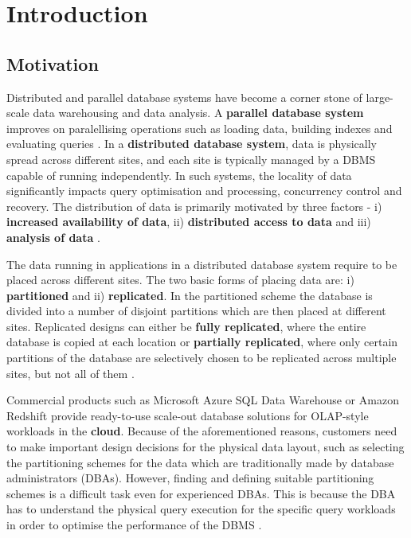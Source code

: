 \chapter{Introduction}

\section{Motivation}
Distributed and parallel database systems have become a corner stone of large-scale data warehousing and data analysis. A \textbf{parallel database system} improves on paralellising operations such as loading data, building indexes and evaluating queries \cite{Ramakrishnan:2002:DMS:560733}. In a \textbf{distributed database system}, data is physically spread across different sites, and each site is typically managed by a DBMS capable of running independently. In such systems, the locality of data significantly impacts query optimisation and processing, concurrency control and recovery. The distribution of data is primarily motivated by three factors - i) \textbf{increased availability of data}, ii) \textbf{distributed access to data} and iii) \textbf{analysis of data} \cite{Ramakrishnan:2002:DMS:560733}. 

The data running in applications in a distributed database system require to be placed across different sites. The two basic forms of placing data are: i) \textbf{partitioned} and ii) \textbf{replicated}. In the partitioned scheme the database is divided into a number of disjoint partitions which are then placed at different sites. Replicated designs can either be \textbf{fully replicated}, where the entire database is copied at each location or \textbf{partially replicated}, where only certain partitions of the database are selectively chosen to be replicated across multiple sites, but not all of them \cite{ozsu2011principles}. 

Commercial products such as Microsoft Azure SQL Data Warehouse or Amazon Redshift provide ready-to-use scale-out database solutions for OLAP-style workloads in the \textbf{cloud}. Because of the aforementioned reasons, customers need to make important design decisions for the physical data layout, such as selecting the partitioning schemes for the data which are traditionally made by database administrators (DBAs). However, finding and defining suitable partitioning schemes is a difficult task even for experienced DBAs. This is because the DBA has to understand the physical query execution for the specific query workloads in order to optimise the performance of the DBMS \cite{jindal2011relax}. 


